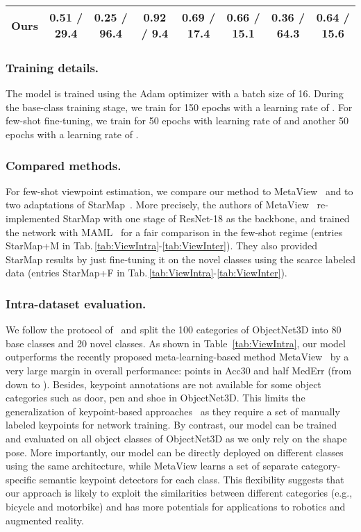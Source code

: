 \documentclass[runningheads]{llncs}
\begin{document}
\begin{table}[t]
{\begin{tabular}{l cccccc c}
	Ours & {\bf 0.51} / {\bf 29.4} & {\bf 0.25} / {\bf 96.4} & {\bf 0.92} / {\bf 9.4} & {\bf 0.69} / {\bf 17.4} & {\bf 0.66} / {\bf 15.1} & {\bf 0.36} / {\bf 64.3} & \cellcolor{HL}\textbf{0.64} / \textbf{15.6} \\ \bottomrule
	\end{tabular}}
\end{table}

\subsubsection{Training details.}
The model is trained using the Adam optimizer with a batch size of 16. During the base-class training stage, we train for 150 epochs with a learning rate of . For few-shot fine-tuning, we train for 50 epochs with learning rate of  and another 50 epochs with a learning rate of .


\subsubsection{Compared methods.}
For few-shot viewpoint estimation, we compare our method to MetaView~\cite{Tseng2019FewShotVE} and to two adaptations of StarMap~\cite{starmap2018}.
More precisely, the authors of MetaView~\cite{Tseng2019FewShotVE} re-implemented StarMap with one stage of ResNet-18 as the backbone, and trained the network with MAML~\cite{Finn2017MAML} for a fair comparison in the few-shot regime (entries StarMap+M in Tab.\,\ref{tab:ViewIntra}-\ref{tab:ViewInter}).
They also provided StarMap results by just fine-tuning it on the novel classes using the scarce labeled data (entries StarMap+F in Tab.\,\ref{tab:ViewIntra}-\ref{tab:ViewInter}).



\subsubsection{Intra-dataset evaluation.}
We follow the protocol of~\cite{Tseng2019FewShotVE,Xiao2019PoseFromShape} and split the 100 categories of ObjectNet3D into 80 base classes and 20 novel classes.
As shown in Table~\ref{tab:ViewIntra}, our model outperforms the recently proposed meta-learning-based method MetaView~\cite{Tseng2019FewShotVE} by a very large margin in overall performance:  points in Acc30 and half MedErr (from  down to ).
Besides, keypoint annotations are not available for some object categories such as door, pen and shoe in ObjectNet3D.
This limits the generalization of keypoint-based approaches~\cite{starmap2018,Tseng2019FewShotVE} as they require a set of manually labeled keypoints for network training.
By contrast, our model can be trained and evaluated on all object classes of ObjectNet3D as we only rely on the shape pose. 
More importantly, our model can be directly deployed on different classes using the same architecture, while MetaView learns a set of separate category-specific semantic keypoint detectors for each class.
This flexibility suggests that our approach is likely to exploit the similarities between different categories (e.g., bicycle and motorbike) and has more potentials for applications to robotics and augmented reality.
\end{document}
